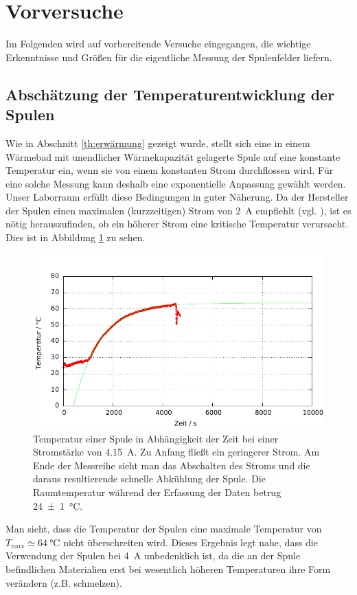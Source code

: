 \documentclass[12pt,a4paper]{article}
\begin{document}
\section{Vorversuche}
Im Folgenden wird auf vorbereitende Versuche eingegangen, die wichtige Erkenntnisse und Größen für die eigentliche Messung der Spulenfelder liefern.
\subsection{Abschätzung der Temperaturentwicklung der Spulen}
Wie in Abschnitt \ref{th:erwärmung} gezeigt wurde, stellt sich eine in einem Wärmebad  mit unendlicher Wärmekapazität gelagerte Spule auf eine konstante Temperatur ein, wenn sie von einem konstanten Strom durchflossen wird. Für eine solche Messung kann deshalb eine exponentielle Anpassung gewählt werden. Unser Laborraum erfüllt diese Bedingungen in guter Näherung. Da der Hersteller der Spulen einen maximalen (kurzzeitigen) Strom von \SI{2}{A} empfiehlt (vgl. \cite{leybold}), ist es nötig herauszufinden, ob ein höherer Strom eine kritische Temperatur verursacht. Dies ist in Abbildung \ref{fig:tempcurve} zu sehen.
\begin{figure}[H]
	\centering
	\includegraphics[scale=1]{Temperaturcurve.pdf}
	\caption{Temperatur einer Spule in Abhängigkeit der Zeit bei einer Stromstärke von \SI{4.15}{A}. Zu Anfang fließt ein geringerer Strom. Am Ende der Messreihe sieht man das Abschalten des Stroms und die daraus resultierende schnelle Abkühlung der Spule. Die Raumtemperatur während der Erfassung der Daten betrug \SI{24\pm 1}{\celsius}.}
	\label{fig:tempcurve}
\end{figure}
Man sieht, dass die Temperatur der Spulen eine maximale Temperatur von $T_{max}\simeq \SI{64}{\celsius}$ nicht überschreiten wird. Dieses Ergebnis legt nahe, dass die Verwendung der Spulen bei \SI{4}{A} unbedenklich ist, da die an der Spule befindlichen Materialien erst bei wesentlich höheren Temperaturen ihre Form verändern (z.B. schmelzen). 
\end{document}
